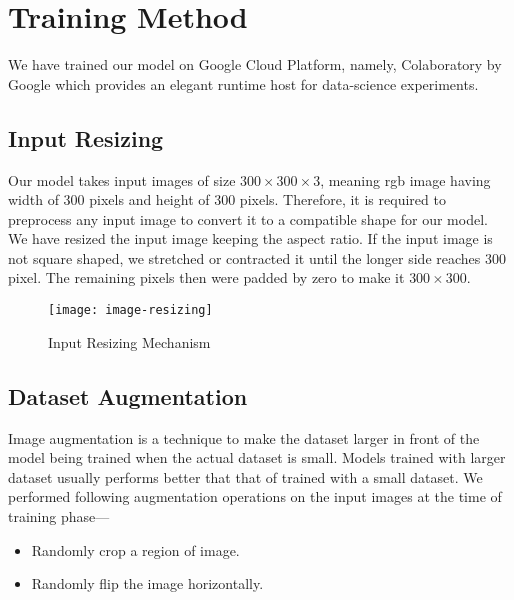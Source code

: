             
    \section{Training Method}
        We have trained our model on Google Cloud Platform, namely, Colaboratory by Google which provides an elegant runtime host for data-science experiments.  
            
        \subsection{Input Resizing}
            Our model takes input images of size $300\times 300\times 3$, meaning \acrshort{rgb} image having width of 300 pixels and height of 300 pixels. Therefore, it is required to preprocess any input image to convert it to a compatible shape for our model.
            We have resized the input image keeping the aspect ratio. If the input image is not square shaped, we stretched or contracted it until the longer side reaches 300 pixel. The remaining pixels then were padded by zero to make it $300\times 300$. 
            \begin{figure}[h]
                \centering
                \texttt{[image: image-resizing]}
                \caption{Input Resizing Mechanism}
                \label{fig:img_resize}
            \end{figure}          
            
        \subsection{Dataset Augmentation}
            Image augmentation is a technique to make the dataset larger in front of the model being trained when the actual dataset is small\cite{perez2017effectiveness}. Models trained with larger dataset usually performs better that that of trained with a small dataset\cite{perez2017effectiveness}.            
            We performed following augmentation operations on the input images at the time of training phase---
            
            \begin{itemize}
                \item Randomly crop a region of image.
                \item Randomly flip the image horizontally.
            \end{itemize}
            
